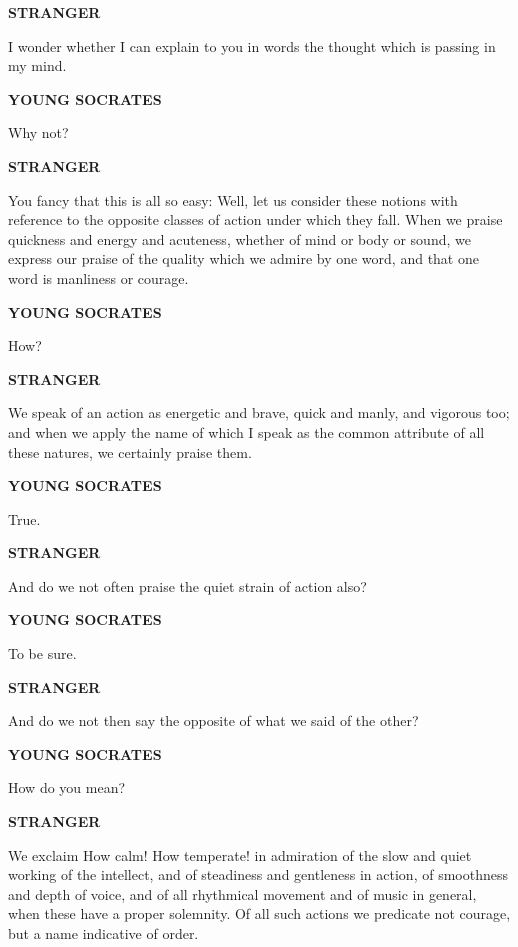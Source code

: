 \documentclass[11pt,letter]{article}
\begin{document}
\par \textbf{STRANGER}
\par   I wonder whether I can explain to you in words the thought which is passing in my mind.

\par \textbf{YOUNG SOCRATES}
\par   Why not?

\par \textbf{STRANGER}
\par   You fancy that this is all so easy:  Well, let us consider these notions with reference to the opposite classes of action under which they fall. When we praise quickness and energy and acuteness, whether of mind or body or sound, we express our praise of the quality which we admire by one word, and that one word is manliness or courage.

\par \textbf{YOUNG SOCRATES}
\par   How?

\par \textbf{STRANGER}
\par   We speak of an action as energetic and brave, quick and manly, and vigorous too; and when we apply the name of which I speak as the common attribute of all these natures, we certainly praise them.

\par \textbf{YOUNG SOCRATES}
\par   True.

\par \textbf{STRANGER}
\par   And do we not often praise the quiet strain of action also?

\par \textbf{YOUNG SOCRATES}
\par   To be sure.

\par \textbf{STRANGER}
\par   And do we not then say the opposite of what we said of the other?

\par \textbf{YOUNG SOCRATES}
\par   How do you mean?

\par \textbf{STRANGER}
\par   We exclaim How calm! How temperate! in admiration of the slow and quiet working of the intellect, and of steadiness and gentleness in action, of smoothness and depth of voice, and of all rhythmical movement and of music in general, when these have a proper solemnity. Of all such actions we predicate not courage, but a name indicative of order.
\end{document}
